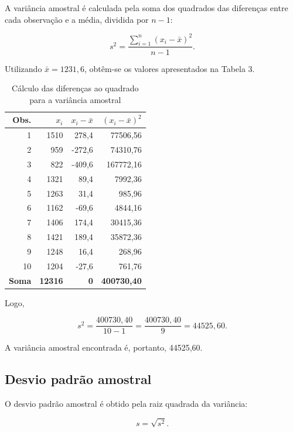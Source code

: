 \documentclass[12pt,a4paper]{article}
\begin{document}
A variância amostral é calculada pela soma dos quadrados das diferenças entre
cada observação e a média, dividida por $n-1$:

\begin{equation}
s^2 =
\frac{
\sum_{i=1}^{n}(x_i-\bar{x})^2
}{n-1}.
\end{equation}

Utilizando $\bar{x}=1231{,}6$, obtêm-se os valores apresentados na Tabela 3.

\begin{table}[H]
\centering
\caption{Cálculo das diferenças ao quadrado para a variância amostral}
\begin{tabular}{rrrr}
\toprule
\textbf{Obs.} &
\textbf{$x_i$} &
\textbf{$x_i-\bar{x}$} &
\textbf{$(x_i-\bar{x})^2$} \\
\midrule
1  & 1510 & 278,4  & 77506,56 \\
2  & 959  & -272,6 & 74310,76 \\
3  & 822  & -409,6 & 167772,16 \\
4  & 1321 & 89,4   & 7992,36 \\
5  & 1263 & 31,4   & 985,96 \\
6  & 1162 & -69,6  & 4844,16 \\
7  & 1406 & 174,4  & 30415,36 \\
8  & 1421 & 189,4  & 35872,36 \\
9  & 1248 & 16,4   & 268,96 \\
10 & 1204 & -27,6  & 761,76 \\
\midrule
\textbf{Soma} & \textbf{12316} & \textbf{0} & \textbf{400730,40} \\
\bottomrule
\end{tabular}
\end{table}

Logo,

\begin{equation}
s^2 =
\frac{400730{,}40}{10-1}
=
\frac{400730{,}40}{9}
=
44525{,}60.
\end{equation}

A variância amostral encontrada é, portanto, 44525,60.

\subsection{Desvio padrão amostral}

O desvio padrão amostral é obtido pela raiz quadrada da variância:

\begin{equation}
s = \sqrt{s^2}.
\end{equation}
\end{document}
